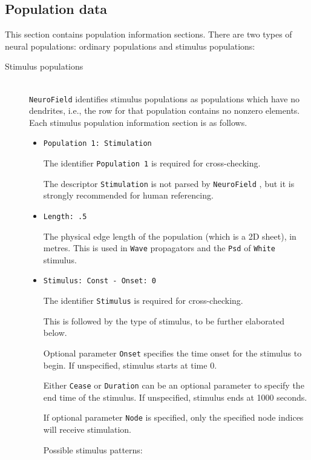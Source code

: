 \documentclass[12pt,a4paper]{article}
\newcommand{\type}[1]{ {\small\small\tt #1} }
\newcommand{\NF}[0]{ \type{NeuroField}}
\begin{document}
\subsection{Population data}
\label{sec:pop}
This section contains population information sections. There are two types of neural populations: ordinary populations and stimulus populations:
\begin{description}

\item[Stimulus populations]\ \\

\NF identifies stimulus populations as populations which have no dendrites, i.e., the row for that population contains no nonzero elements.  Each stimulus population information section is as follows.
\begin{itemize}
	\item \begin{lstlisting}
Population 1: Stimulation
	\end{lstlisting}
	The identifier \type{Population 1} is required for cross-checking.

	The descriptor \type{Stimulation} is not parsed by \NF, but it is strongly recommended for human referencing.
	\item
	\begin{lstlisting}
Length: .5
	\end{lstlisting}
	The physical edge length of the population (which is a 2D sheet), in metres. This is used in \type{Wave} propagators and the \type{Psd} of \type{White} stimulus.
	\item
	\begin{lstlisting}
Stimulus: Const - Onset: 0
	\end{lstlisting}
	The identifier \type{Stimulus} is required for cross-checking.

	This is followed by the type of stimulus, to be further elaborated below.

	Optional parameter \type{Onset} specifies the time onset for the stimulus to begin. If unspecified, stimulus starts at time 0.

	Either \type{Cease} or \type{Duration} can be an optional parameter to specify the end time of the stimulus. If unspecified, stimulus ends at 1000 seconds.

	If optional parameter \type{Node} is specified, only the specified node indices will receive stimulation.

	Possible stimulus patterns:


\end{itemize}
\end{description}
\end{document}
